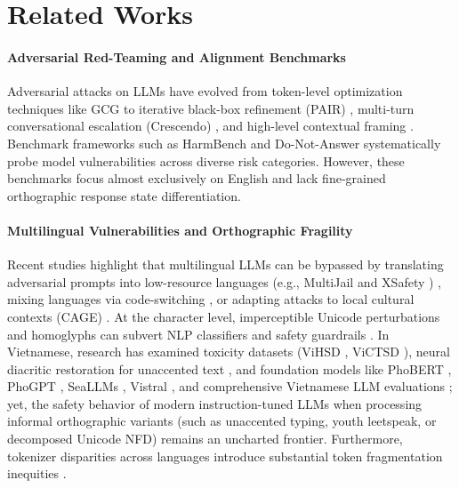 \documentclass[11pt]{article}
\begin{document}
\section{Related Works}
\label{sec:related_work}

\paragraph{Adversarial Red-Teaming and Alignment Benchmarks}
Adversarial attacks on LLMs have evolved from token-level optimization techniques like GCG \cite{zou2023universal} to iterative black-box refinement (PAIR) \cite{chao2023jailbreaking}, multi-turn conversational escalation (Crescendo) \cite{russinovich2025crescendo}, and high-level contextual framing \cite{wei2024jailbreak,yuan2024gpt4v}. Benchmark frameworks such as HarmBench \cite{harmbench2024} and Do-Not-Answer \cite{wang2023donotanswer} systematically probe model vulnerabilities across diverse risk categories. However, these benchmarks focus almost exclusively on English and lack fine-grained orthographic response state differentiation.

\paragraph{Multilingual Vulnerabilities and Orthographic Fragility}
Recent studies highlight that multilingual LLMs can be bypassed by translating adversarial prompts into low-resource languages (e.g., MultiJail \cite{deng2023multilingual} and XSafety \cite{wang2024xsafety}) \cite{yong2023lowresource,shen2024multilingual}, mixing languages via code-switching \cite{yoo2024codeswitching}, or adapting attacks to local cultural contexts (CAGE) \cite{kim2026cage}. At the character level, imperceptible Unicode perturbations and homoglyphs can subvert NLP classifiers and safety guardrails \cite{boucher2022bad,polyguard2025}. In Vietnamese, research has examined toxicity datasets (ViHSD \cite{luu2021vihsd}, ViCTSD \cite{nguyen2021victsd}), neural diacritic restoration for unaccented text \cite{nguyen2020diacritics}, and foundation models like PhoBERT \cite{nguyen2020phobert}, PhoGPT \cite{nguyen2023phogpt}, SeaLLMs \cite{dam2024seallms}, Vistral \cite{nguyen2024vistral}, and comprehensive Vietnamese LLM evaluations \cite{truong2024crossing}; yet, the safety behavior of modern instruction-tuned LLMs when processing informal orthographic variants (such as unaccented typing, youth leetspeak, or decomposed Unicode NFD) remains an uncharted frontier. Furthermore, tokenizer disparities across languages introduce substantial token fragmentation inequities \cite{sennrich2016subword,petrov2023language,ahia2023all}.
\end{document}
